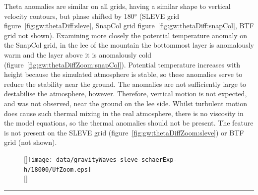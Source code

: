Theta anomalies are similar on all grids, having a similar shape to vertical velocity contours, but phase shifted by \ang{180} (SLEVE grid figure~\ref{fig:gw:thetaDiff:sleve}, SnapCol grid figure~\ref{fig:gw:thetaDiff:snapCol}, BTF grid not shown). 
Examining more closely the potential temperature anomaly on the SnapCol grid, in the lee of the mountain the bottommost layer is anomalously warm and the layer above it is anomalously cold (figure~\ref{fig:gw:thetaDiffZoom:snapCol}).  Potential temperature increases with height because the simulated atmosphere is stable, so these anomalies serve to reduce the stability near the ground.  The anomalies are not sufficiently large to destabilise the atmosphere, however.   Therefore, vertical motion is not expected, and was not observed, near the ground on the lee side.   Whilst turbulent motion does cause such thermal mixing in the real atmosphere, there is no viscosity in the model equations, so the thermal anomalies should not be present.  The feature is not present on the SLEVE grid (figure~\ref{fig:gw:thetaDiffZoom:sleve}) or BTF grid (not shown).

\begin{figure}
	[\textwidth]{\texttt{[image: data/gravityWaves-sleve-schaerExp-h/18000/UfZoom.eps]}} \\
	[\textwidth]{\TODO{}} \\
	\caption{}
	\label{fig:gw:flow}
\end{figure}

\begin{figure}
	\centering
	
	\caption{}
	\label{fig:gw:exner-theta}
\end{figure}



\hrule

